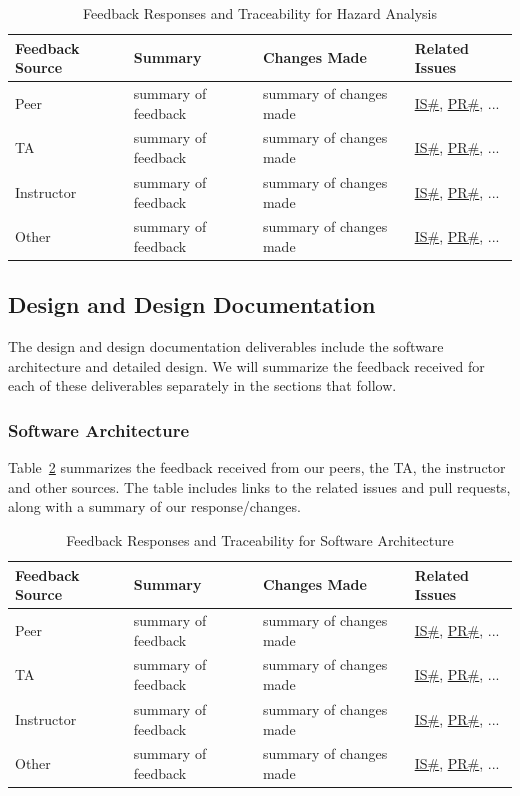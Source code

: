 \documentclass{article}
\begin{document}
\begin{longtable}{|p{2cm}|p{4cm}|p{5cm}|p{4cm}|}
\caption{Feedback Responses and Traceability for Hazard Analysis}
\label{Tbl-Hazard}\\

\hline
\textbf{Feedback Source} & \textbf{Summary} & \textbf{Changes Made} & \textbf{Related Issues} \\ 
\hline
\endhead

Peer & summary of feedback & summary of changes made & \href{link}{IS\#},
\href{link}{PR\#}, ... \\
\hline
TA & summary of feedback & summary of changes made & \href{link}{IS\#},
\href{link}{PR\#}, ... \\
\hline
Instructor & summary of feedback & summary of changes made & \href{link}{IS\#},
\href{link}{PR\#}, ... \\
\hline
Other & summary of feedback & summary of changes made & \href{link}{IS\#},
\href{link}{PR\#}, ... \\
\hline
\end{longtable}

\subsection{Design and Design Documentation}

The design and design documentation deliverables include the software
architecture and detailed design.  We will summarize the feedback received for
each of these deliverables separately in the sections that follow.

\subsubsection{Software Architecture}

Table~\ref{Tbl-Architecture} summarizes the feedback received from our peers,
the TA, the instructor and other sources.  The table includes links to the
related issues and pull requests, along with a summary of our response/changes.

\begin{longtable}{|p{2cm}|p{4cm}|p{5cm}|p{4cm}|}
\caption{Feedback Responses and Traceability for Software Architecture}
\label{Tbl-Architecture}\\

\hline
\textbf{Feedback Source} & \textbf{Summary} & \textbf{Changes Made} & \textbf{Related Issues} \\ 
\hline
\endhead

Peer & summary of feedback & summary of changes made & \href{link}{IS\#}, \href{link}{PR\#}, ... \\
\hline
TA & summary of feedback & summary of changes made & \href{link}{IS\#}, \href{link}{PR\#}, ... \\
\hline
Instructor & summary of feedback & summary of changes made & \href{link}{IS\#}, \href{link}{PR\#}, ... \\
\hline
Other & summary of feedback & summary of changes made & \href{link}{IS\#}, \href{link}{PR\#}, ... \\
\hline
\end{longtable}
\end{document}
